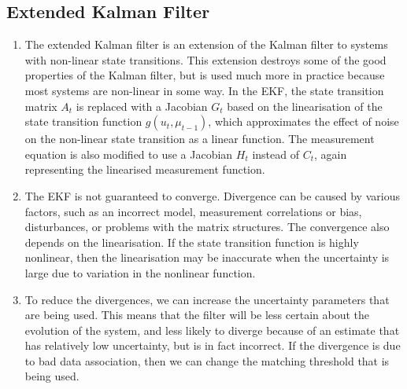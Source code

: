 \documentclass[a4paper,12pt]{article}
\begin{document}
\subsection{Extended Kalman Filter}
\begin{enumerate}[resume]
\item The extended Kalman filter is an extension of the Kalman filter to systems
  with non-linear state transitions. This extension destroys some of the good
  properties of the Kalman filter, but is used much more in practice because
  most systems are non-linear in some way. In the EKF, the state transition
  matrix $A_t$ is replaced with a Jacobian $G_t$ based on the linearisation of
  the state transition function $g(u_t,\mu_{t-1})$, which approximates the
  effect of noise on the non-linear state transition as a linear function. The
  measurement equation is also modified to use a Jacobian $H_t$ instead of
  $C_t$, again representing the linearised measurement function.
\item The EKF is not guaranteed to converge. Divergence can be caused by various
  factors, such as an incorrect model, measurement correlations or bias,
  disturbances, or problems with the matrix structures. The convergence also
  depends on the linearisation. If the state transition function is highly
  nonlinear, then the linearisation may be inaccurate when the uncertainty is
  large due to variation in the nonlinear function.
\item To reduce the divergences, we can increase the uncertainty parameters that
  are being used. This means that the filter will be less certain about the
  evolution of the system, and less likely to diverge because of an estimate
  that has relatively low uncertainty, but is in fact incorrect. If the
  divergence is due to bad data association, then we can change the matching
  threshold that is being used.
\end{enumerate}
\end{document}
